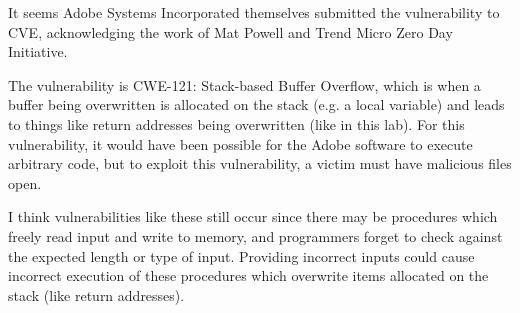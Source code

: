 \documentclass[11pt]{article}
\begin{document}
\begin{enumerate}[left = \parindent, label=\textbf{Task \arabic* -}]
    It seems Adobe Systems Incorporated themselves submitted the vulnerability to CVE, acknowledging the work of Mat Powell and Trend Micro Zero Day Initiative.

    The vulnerability is CWE-121: Stack-based Buffer Overflow, which is when a buffer being overwritten is allocated on the stack (e.g. a local variable) and leads to things like return addresses being overwritten (like in this lab). For this vulnerability, it would have been possible for the Adobe software to execute arbitrary code, but to exploit this vulnerability, a victim must have malicious files open.

    I think vulnerabilities like these still occur since there may be procedures which freely read input and write to memory, and programmers forget to check against the expected length or type of input. Providing incorrect inputs could cause incorrect execution of these procedures which overwrite items allocated on the stack (like return addresses).
\end{enumerate}
\end{document}
